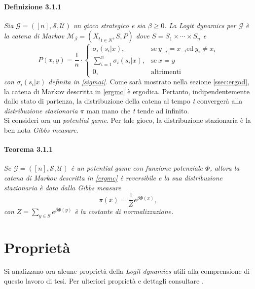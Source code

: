 \paragraph{Definizione 3.1.1} \textit{Sia $\mathcal{G} = ([n], \mathcal{S}, \mathcal{U})$ un gioco strategico e sia $\beta \geq 0$. La Logit dynamics per $\mathcal{G}$ è la catena di Markov $\mathcal{M}_{\beta} = ({X_t}_{t \in N}, S, P)$ dove $S = S_1 \times \cdots \times S_n$ e}
\begin{equation}
	P(x, y) = \frac{1}{n} \cdot 
	\begin{cases}
	\sigma_i(s_i|x), & \text{se}\ y_{-i} = x_{-i} \text{ed}\ y_i \neq x_i\\
	\sum_{i=1}^{n}{\sigma_i(s_i|x)}, & \text{se}\ x = y\\
	0, & \text{altrimenti}
	\end{cases}
	\label{ergmc}
\end{equation}
\textit{con $\sigma_i(s_i|x)$ definita in \ref{sigmai}.}
Come sarà mostrato nella sezione \ref{ssec:ergod}, la catena di Markov descritta in \ref{ergmc} è ergodica. Pertanto, indipendentemente dallo stato di partenza, la distribuzione della catena al tempo \textit{t} convergerà alla \textit{distribuzione stazionaria $\pi$} man mano che \textit{t} tende ad infinito.\\
Si consideri ora un \textit{potential game}. Per tale gioco, la distribuzione stazionaria è la ben nota \textit{Gibbs measure}.
\paragraph{Teorema 3.1.1} \textit{Se $\mathcal{G} = ([n], \mathcal{S}, \mathcal{U})$ è un potential game con funzione potenziale $\Phi$, allora la catena di Markov descritta in \ref{ergmc} è reversibile e la sua distribuzione stazionaria è data dalla Gibbs measure}
\begin{equation}
	\pi(x) = \frac{1}{Z}{e^{\beta\Phi(x)}},
	\label{gibbsm}
\end{equation}
\textit{con $Z = \sum_{y\in S}{e^{\beta\Phi(y)}}$ è la costante di normalizzazione.}
\section{Proprietà}
Si analizzano ora alcune proprietà della \textit{Logit dynamics} utili alla comprensione di questo lavoro di tesi. Per ulteriori proprietà e dettagli consultare \cite{ferraioli2012logit}.
